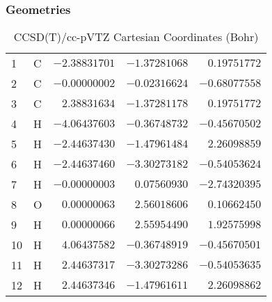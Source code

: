 \documentclass[10pt,oneside]{article}
\begin{document}
\clearpage

\subsection{\ \ \ }

\subsubsection*{Geometries}
\begin{table}[h!]
\centering
\caption{CCSD(T)/cc-pVTZ Cartesian Coordinates (Bohr)}
\begin{tabular}{llrrr}
1  & C  & $-2.38831701$ & $-1.37281068$ & $ 0.19751772$ \\
2  & C  & $-0.00000002$ & $-0.02316624$ & $-0.68077558$ \\
3  & C  & $ 2.38831634$ & $-1.37281178$ & $ 0.19751772$ \\
4  & H  & $-4.06437603$ & $-0.36748732$ & $-0.45670502$ \\
5  & H  & $-2.44637430$ & $-1.47961484$ & $ 2.26098859$ \\
6  & H  & $-2.44637460$ & $-3.30273182$ & $-0.54053624$ \\
7  & H  & $-0.00000003$ & $ 0.07560930$ & $-2.74320395$ \\
8  & O  & $ 0.00000063$ & $ 2.56018606$ & $ 0.10662450$ \\
9  & H  & $ 0.00000066$ & $ 2.55954490$ & $ 1.92575998$ \\
10 & H  & $ 4.06437582$ & $-0.36748919$ & $-0.45670501$ \\
11 & H  & $ 2.44637317$ & $-3.30273286$ & $-0.54053635$ \\
12 & H  & $ 2.44637346$ & $-1.47961611$ & $ 2.26098862$ \\
\end{tabular}
\end{table}
\end{document}
